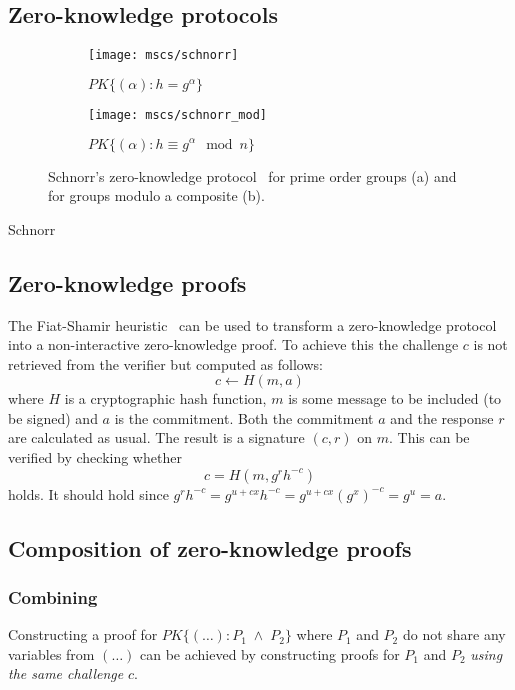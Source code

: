 \subsection{Zero-knowledge protocols}

\begin{figure}
  \centering
  \begin{subfigure}[b]{0.45\textwidth}
    \texttt{[image: mscs/schnorr]}
    \caption{$PK\{(\alpha) : h = g^\alpha \}$}
    \label{msc:schnorr}
  \end{subfigure}
  \quad
  \begin{subfigure}[b]{0.45\textwidth}
    \texttt{[image: mscs/schnorr\_mod]}
    \caption{$PK\{(\alpha) : h \equiv g^\alpha \mod n \}$}
    \label{msc:schnorr_mod}
  \end{subfigure}
  \caption{Schnorr's zero-knowledge protocol~\cite{Schnorr1991} for prime order groups (a) and for groups modulo a composite (b).}
  \label{fig:schnorr}
\end{figure}

Schnorr

\subsection{Zero-knowledge proofs}

The Fiat-Shamir heuristic~\cite{FiatShamir1987} can be used to transform a zero-knowledge protocol into a non-interactive zero-knowledge proof. To achieve this the challenge $c$ is not retrieved from the verifier but computed as follows: $$c \leftarrow H(m,a)$$ where $H$ is a cryptographic hash function, $m$ is some message to be included (to be signed) and $a$ is the commitment. Both the commitment $a$ and the response $r$ are calculated as usual. The result is a signature $(c,r)$ on $m$. This can be verified by checking whether $$c = H(m, g^r h^{-c})$$ holds. It should hold since $g^r h^{-c} = g^{u + cx} h^{-c} = g^{u + cx} (g^x)^{-c} = g^u = a$.

\subsection{Composition of zero-knowledge proofs}

\subsubsection{Combining}

Constructing a proof for $PK\{(\dots) : P_1 \;\land\; P_2 \}$ where $P_1$ and $P_2$ do not share any variables from $(\dots)$ can be achieved by constructing proofs for $P_1$ and $P_2$ \emph{using the same challenge} $c$.

